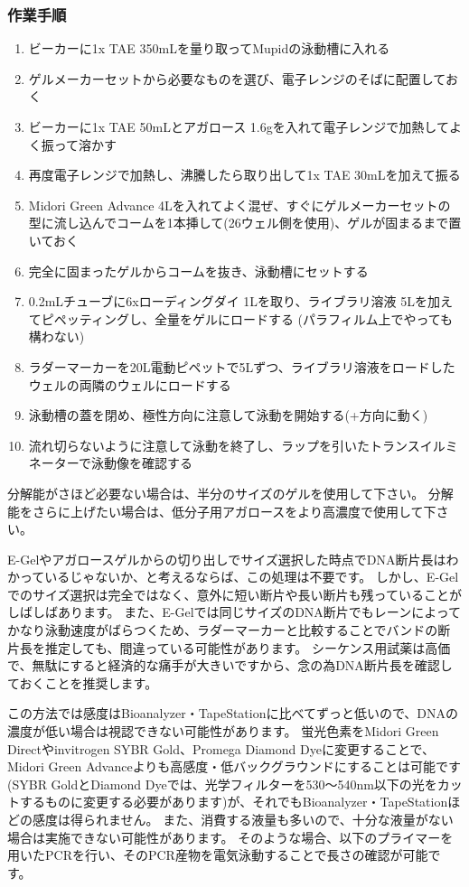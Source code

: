 \documentclass[titlepage,10pt,a4paper,uplatex]{jsbook}
\begin{document}
\subsubsection{作業手順}
\begin{enumerate}
\item ビーカーに1x TAE 350mLを量り取ってMupidの泳動槽に入れる
\item ゲルメーカーセットから必要なものを選び、電子レンジのそばに配置しておく
\item ビーカーに1x TAE 50mLとアガロース 1.6gを入れて電子レンジで加熱してよく振って溶かす
\item 再度電子レンジで加熱し、沸騰したら取り出して1x TAE 30mLを加えて振る
\item Midori Green Advance 4{\textmu}Lを入れてよく混ぜ、すぐにゲルメーカーセットの型に流し込んでコームを1本挿して(26ウェル側を使用)、ゲルが固まるまで置いておく
\item 完全に固まったゲルからコームを抜き、泳動槽にセットする
\item 0.2mLチューブに6xローディングダイ 1{\textmu}Lを取り、ライブラリ溶液 5{\textmu}Lを加えてピペッティングし、全量をゲルにロードする (パラフィルム上でやっても構わない)
\item ラダーマーカーを20{\textmu}L電動ピペットで5{\textmu}Lずつ、ライブラリ溶液をロードしたウェルの両隣のウェルにロードする
\item 泳動槽の蓋を閉め、極性方向に注意して泳動を開始する(+方向に動く)
\item 流れ切らないように注意して泳動を終了し、ラップを引いたトランスイルミネーターで泳動像を確認する
\end{enumerate}

分解能がさほど必要ない場合は、半分のサイズのゲルを使用して下さい。
分解能をさらに上げたい場合は、低分子用アガロースをより高濃度で使用して下さい。

E-Gelやアガロースゲルからの切り出しでサイズ選択した時点でDNA断片長はわかっているじゃないか、と考えるならば、この処理は不要です。
しかし、E-Gelでのサイズ選択は完全ではなく、意外に短い断片や長い断片も残っていることがしばしばあります。
また、E-Gelでは同じサイズのDNA断片でもレーンによってかなり泳動速度がばらつくため、ラダーマーカーと比較することでバンドの断片長を推定しても、間違っている可能性があります。
シーケンス用試薬は高価で、無駄にすると経済的な痛手が大きいですから、念の為DNA断片長を確認しておくことを推奨します。

この方法では感度はBioanalyzer・TapeStationに比べてずっと低いので、DNAの濃度が低い場合は視認できない可能性があります。
蛍光色素をMidori Green Directやinvitrogen SYBR Gold、Promega Diamond Dyeに変更することで、Midori Green Advanceよりも高感度・低バックグラウンドにすることは可能です(SYBR GoldとDiamond Dyeでは、光学フィルターを530～540nm以下の光をカットするものに変更する必要があります)が、それでもBioanalyzer・TapeStationほどの感度は得られません。
また、消費する液量も多いので、十分な液量がない場合は実施できない可能性があります。
そのような場合、以下のプライマーを用いたPCRを行い、そのPCR産物を電気泳動することで長さの確認が可能です。
\end{document}

